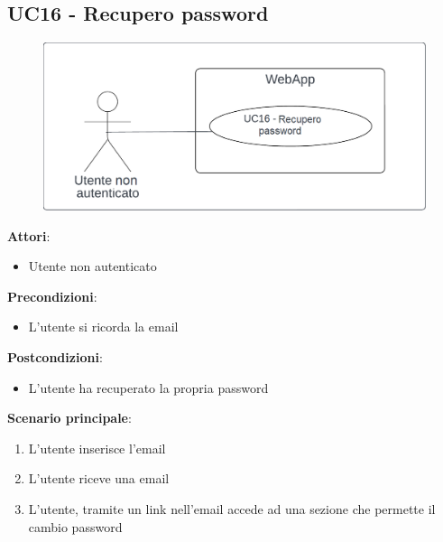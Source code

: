 \subsection{UC16 - Recupero password} \label{usecase:16}
\begin{figure}[H]
    \centering
    \includegraphics[width=0.9\linewidth]{ucd/ucd16.png}
\end{figure}
\textbf{Attori}:
\begin{itemize}
    \item Utente non autenticato
\end{itemize}
\textbf{Precondizioni}:
\begin{itemize}
    \item L'utente si ricorda la email
\end{itemize}
\textbf{Postcondizioni}:
\begin{itemize}
    \item L'utente ha recuperato la propria password
\end{itemize}
\textbf{Scenario principale}:
\begin{enumerate}
    \item L'utente inserisce l'email
    \item L'utente riceve una email
    \item L'utente, tramite un link nell'email accede ad una sezione che permette il cambio password
\end{enumerate}
\newpage